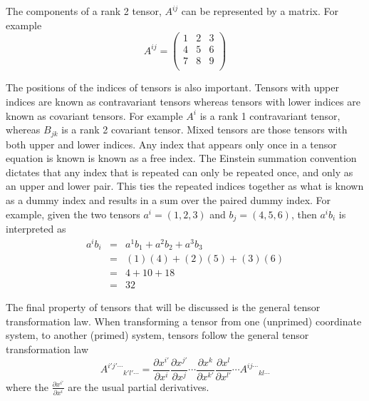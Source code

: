 \documentclass[12pt, oneside]{smuthesis}
\newcommand{\mixtensor}[3]{{#1}^{#2}{}_{#3}}
\newcommand{\contensor}[2]{{#1}^{#2}}
\newcommand{\covtensor}[2]{{#1}_{#2}}
\begin{document}
The components of a rank 2 tensor, $A^{ij}$ can be represented by a matrix. For example
\begin{equation}
\nonumber
\contensor{A}{ij}=
\begin{pmatrix}
1 & 2 & 3 \\
4 & 5 & 6 \\
7 & 8 & 9 \\
\end{pmatrix}
\end{equation}

The positions of the indices of tensors is also important. Tensors with upper indices are known as contravariant tensors whereas tensors with lower indices are known as covariant tensors. For example $A^{i}$ is a rank 1 contravariant tensor, whereas $B_{jk}$ is a rank 2 covariant tensor. Mixed tensors are those tensors with both upper and lower indices. Any index that appears only once in a tensor equation is known is known as a free index. The Einstein summation convention dictates that any index that is repeated can only be repeated once, and only as an upper and lower pair. This ties the repeated indices together as what is known as a dummy index and results in a sum over the paired dummy index. For example, given the two tensors $\contensor{a}{i}=\left(1, 2, 3\right)$ and $\covtensor{b}{j}=\left(4, 5, 6\right)$, then $a^{i}b_{i}$ is interpreted as
\begin{eqnarray}
\nonumber
\contensor{a}{i}\covtensor{b}{i} &  = & \contensor{a}{1}\covtensor{b}{1} + \contensor{a}{2}\covtensor{b}{2} + \contensor{a}{3}\covtensor{b}{3}\\\nonumber
& = & (1)(4) + (2)(5) + (3)(6)\\\nonumber
& = & 4 + 10 + 18\\\nonumber
& = & 32
\end{eqnarray}

The final property of tensors that will be discussed is the general tensor transformation law. When transforming a tensor from one (unprimed) coordinate system, to another (primed) system, tensors follow the general tensor transformation law
\begin{equation}
\mixtensor{A}{i'j'\cdots}{k'l'\cdots}=\frac{\partial x^{i'}}{\partial x^{i}}\frac{\partial x^{j'}}{\partial x^{j}}\cdots\frac{\partial x^{k}}{\partial x^{k'}}\frac{\partial x^{l}}{\partial x^{l'}}\cdots\mixtensor{A}{ij\cdots}{kl\cdots}
\end{equation} \label{eqn:tentran}
where the $\frac{\partial x^{i'}}{\partial x^{i}}$ are the usual partial derivatives.
\end{document}
